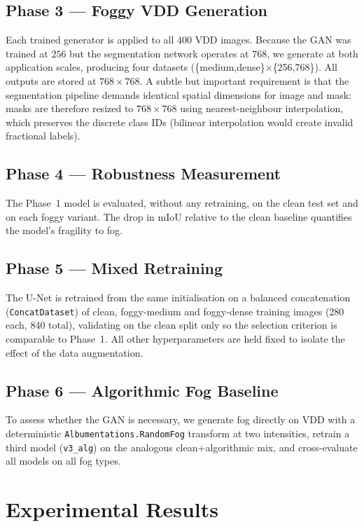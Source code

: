 \documentclass[11pt,a4paper]{article}
\begin{document}
\subsection{Phase 3 --- Foggy VDD Generation}
Each trained generator is applied to all 400 VDD images. Because the GAN was
trained at $256$ but the segmentation network operates at $768$, we generate at
both application scales, producing four datasets
(\{medium,dense\}$\times$\{256,768\}). All outputs are stored at
$768\times768$. A subtle but important requirement is that the segmentation
pipeline demands identical spatial dimensions for image and mask: masks are
therefore resized to $768\times768$ using nearest-neighbour interpolation,
which preserves the discrete class IDs (bilinear interpolation would create
invalid fractional labels).

\subsection{Phase 4 --- Robustness Measurement}
The Phase~1 model is evaluated, without any retraining, on the clean test set
and on each foggy variant. The drop in mIoU relative to the clean baseline
quantifies the model's fragility to fog.

\subsection{Phase 5 --- Mixed Retraining}
The U-Net is retrained from the same initialisation on a balanced
concatenation (\texttt{ConcatDataset}) of clean, foggy-medium and foggy-dense
training images (280 each, 840 total), validating on the clean split only so
the selection criterion is comparable to Phase~1. All other hyperparameters are
held fixed to isolate the effect of the data augmentation.

\subsection{Phase 6 --- Algorithmic Fog Baseline}
To assess whether the GAN is necessary, we generate fog directly on VDD with a
deterministic \texttt{Albumentations.RandomFog} transform at two intensities,
retrain a third model (\texttt{v3\_alg}) on the analogous clean+algorithmic mix,
and cross-evaluate all models on all fog types.

\section{Experimental Results}
\end{document}
